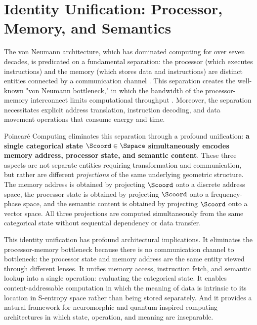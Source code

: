 \section{Identity Unification: Processor, Memory, and Semantics}
\label{sec:identity_unification}

The von Neumann architecture, which has dominated computing for over seven decades, is predicated on a fundamental separation: the processor (which executes instructions) and the memory (which stores data and instructions) are distinct entities connected by a communication channel \citep{vonneumann1945first}. This separation creates the well-known "von Neumann bottleneck," in which the bandwidth of the processor-memory interconnect limits computational throughput \citep{backus1978can}. Moreover, the separation necessitates explicit address translation, instruction decoding, and data movement operations that consume energy and time.

Poincaré Computing eliminates this separation through a profound unification: \textbf{a single categorical state $\Scoord \in \Sspace$ simultaneously encodes memory address, processor state, and semantic content}. These three aspects are not separate entities requiring transformation and communication, but rather are different \textit{projections} of the same underlying geometric structure. The memory address is obtained by projecting $\Scoord$ onto a discrete address space, the processor state is obtained by projecting $\Scoord$ onto a frequency-phase space, and the semantic content is obtained by projecting $\Scoord$ onto a vector space. All three projections are computed simultaneously from the same categorical state without sequential dependency or data transfer.

This identity unification has profound architectural implications. It eliminates the processor-memory bottleneck because there is no communication channel to bottleneck: the processor state and memory address are the same entity viewed through different lenses. It unifies memory access, instruction fetch, and semantic lookup into a single operation: evaluating the categorical state. It enables content-addressable computation in which the meaning of data is intrinsic to its location in S-entropy space rather than being stored separately. And it provides a natural framework for neuromorphic and quantum-inspired computing architectures in which state, operation, and meaning are inseparable.

